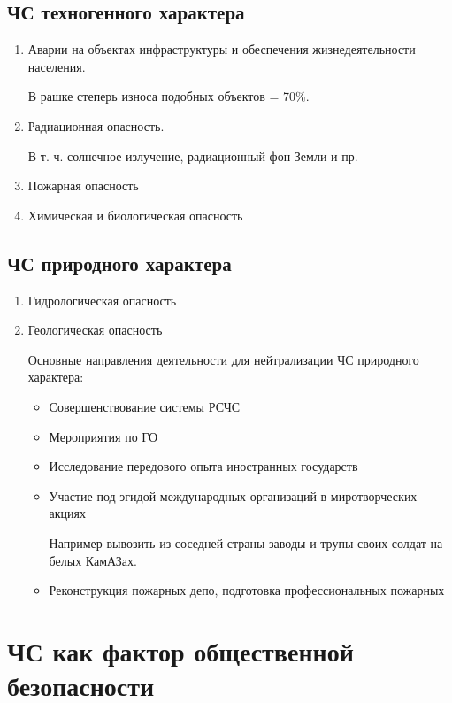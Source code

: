 \documentclass[oneside,final,14pt]{extreport}
\begin{document}
\subsection*{ЧС техногенного характера}
\begin{enumerate}
	\item Аварии на объектах инфраструктуры и обеспечения жизнедеятельности населения.
	
	В рашке степерь износа подобных объектов = 70\%.
	
	\item Радиационная опасность.
	
	В т. ч. солнечное излучение, радиационный фон Земли и пр.
	
	\item Пожарная опасность
	
	\item Химическая и биологическая опасность
\end{enumerate}

\subsection*{ЧС природного характера}
\begin{enumerate}
	\item Гидрологическая опасность
	\item Геологическая опасность
	
	Основные направления деятельности для нейтрализации ЧС природного характера:
	\begin{itemize}
		\item Совершенствование системы РСЧС
		\item Мероприятия по ГО
		\item Исследование передового опыта иностранных государств
		\item Участие под эгидой международных организаций в миротворческих акциях
		
		Например вывозить из соседней страны заводы и трупы своих солдат на белых КамАЗах.
		
		\item Реконструкция пожарных депо, подготовка профессиональных пожарных
	\end{itemize}
\end{enumerate}

\section*{ЧС как фактор общественной безопасности}
\end{document}
